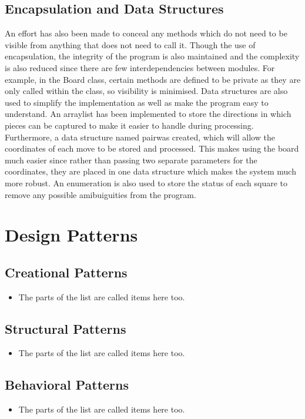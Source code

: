 \documentclass[a4wide, 11pt]{article}
\begin{document}
\subsection{Encapsulation and Data Structures}
An effort has also been made to conceal any methods which do not need to be visible from anything that does not need to call it. Though the use of encapsulation, the integrity of the program is also maintained and the complexity is also reduced since there are few interdependencies between modules. For example, in the Board class, certain methods are defined to be private as they are only called within the class, so visibility is minimised. Data structures are also used to simplify the implementation as well as make the program easy to understand. An arraylist has been implemented to store the directions in which pieces can be captured to make it easier to handle during processing. Furthermore, a data structure named pairwas created, which will allow the coordinates of each move to be stored and processed. This makes using the board much easier since rather than passing two separate parameters for the coordinates, they are placed in one data structure which makes the system much more robust. An enumeration is also used to store the status of each square to remove any possible amibuiguities from the program.

\section{Design Patterns}
\subsection{Creational Patterns}
\begin{itemize}

    \item
    The parts of the list are called items here too.
    
\end{itemize}
\subsection{Structural Patterns}
\begin{itemize}

    \item
    The parts of the list are called items here too.
    
\end{itemize}
\subsection{Behavioral Patterns}
\begin{itemize}

    \item
    The parts of the list are called items here too.
    
\end{itemize}
\end{document}
